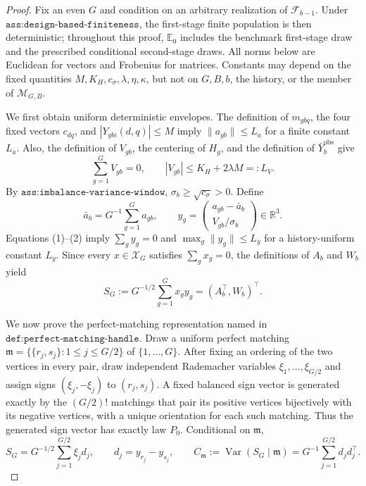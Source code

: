 \documentclass{article}
\begin{document}
\begin{proof}
Fix an even \(G\) and condition on an arbitrary realization of \(\mathcal F_{b-1}\).  Under \(\texttt{ass:design-based-finiteness}\), the first-stage finite population is then deterministic; throughout this proof, \(\mathbb E_0\) includes the benchmark first-stage draw and the prescribed conditional second-stage draws.  All norms below are Euclidean for vectors and Frobenius for matrices.  Constants may depend on the fixed quantities \(M,K_H,c_\sigma,\lambda,\eta,\kappa\), but not on \(G,B,b\), the history, or the member of \(\mathcal M_{G,B}\).

We first obtain uniform deterministic envelopes.  The definition of \(m_{gbq}\), the four fixed vectors \(c_{dq}\), and \(|Y_{gbi}(d,q)|\leq M\) imply \(\|a_{gb}\|\leq L_a\) for a finite constant \(L_a\).  Also, the definition of \(V_{gb}\), the centering of \(H_g\), and the definition of \(\bar Y_b^{\mathrm{obs}}\) give
\[
 \sum_{g=1}^G V_{gb}=0,
 \qquad
 |V_{gb}|\leq K_H+2\lambda M=:L_V.                                      \tag{1}
\]
By \(\texttt{ass:imbalance-variance-window}\), \(\sigma_b\geq\sqrt{c_\sigma}>0\).  Define
\[
 \bar a_b=G^{-1}\sum_{g=1}^G a_{gb},
 \qquad
 y_g=\begin{pmatrix}a_{gb}-\bar a_b\\ V_{gb}/\sigma_b\end{pmatrix}
 \in\mathbb R^3.                                                         \tag{2}
\]
Equations (1)--(2) imply \(\sum_g y_g=0\) and \(\max_g\|y_g\|\leq L_y\) for a history-uniform constant \(L_y\).  Since every \(x\in\mathcal X_G\) satisfies \(\sum_gx_g=0\), the definitions of \(A_b\) and \(W_b\) yield
\[
 S_G:=G^{-1/2}\sum_{g=1}^Gx_gy_g=(A_b^\top,W_b)^\top.                    \tag{3}
\]

We now prove the perfect-matching representation named in \(\texttt{def:perfect-matching-handle}\).  Draw a uniform perfect matching
\(
 \mathfrak m=\{\{r_j,s_j\}:1\leq j\leq G/2\}
\)
of \(\{1,\ldots,G\}\).  After fixing an ordering of the two vertices in every pair, draw independent Rademacher variables \(\xi_1,\ldots,\xi_{G/2}\) and assign signs \((\xi_j,-\xi_j)\) to \((r_j,s_j)\).  A fixed balanced sign vector is generated exactly by the \((G/2)!\) matchings that pair its positive vertices bijectively with its negative vertices, with a unique orientation for each such matching.  Thus the generated sign vector has exactly law \(P_0\).  Conditional on \(\mathfrak m\),
\[
 S_G=G^{-1/2}\sum_{j=1}^{G/2}\xi_jd_j,
 \qquad
 d_j=y_{r_j}-y_{s_j},
 \qquad
 C_{\mathfrak m}:=\operatorname{Var}(S_G\mid\mathfrak m)
     =G^{-1}\sum_{j=1}^{G/2}d_jd_j^\top.                                 \tag{4}
\]


\end{proof}
\end{document}
